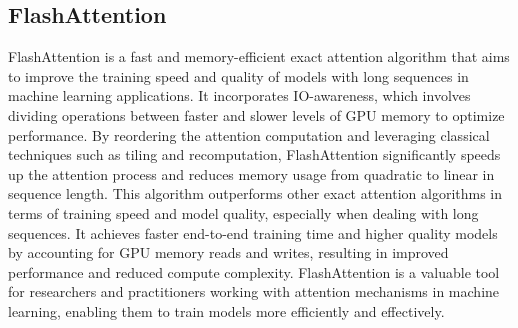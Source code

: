 
\subsection{FlashAttention}

FlashAttention \cite{flash-attention} is a fast and memory-efficient exact attention algorithm that aims to improve the
training speed and quality of models with long sequences in machine learning applications. It incorporates IO-awareness,
which involves dividing operations between faster and slower levels of GPU memory to optimize performance. By reordering
the attention computation and leveraging classical techniques such as tiling and recomputation, FlashAttention
significantly speeds up the attention process and reduces memory usage from quadratic to linear in sequence length. This
algorithm outperforms other exact attention algorithms in terms of training speed and model quality, especially when
dealing with long sequences. It achieves faster end-to-end training time and higher quality models by accounting for GPU
memory reads and writes, resulting in improved performance and reduced compute complexity. FlashAttention is a valuable
tool for researchers and practitioners working with attention mechanisms in machine learning, enabling them to train
models more efficiently and effectively.



%
%

